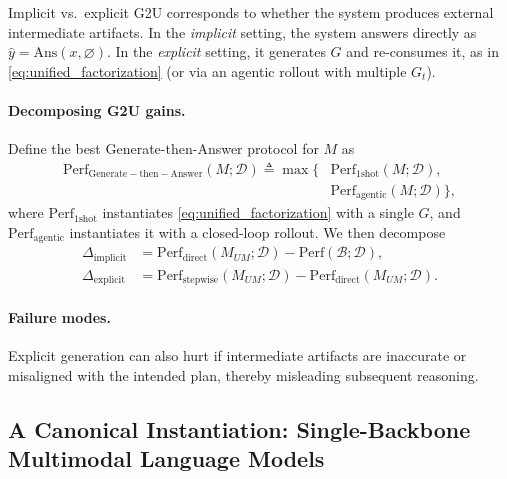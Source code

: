 \documentclass{article}
\theoremstyle{plain}
\theoremstyle{definition}
\theoremstyle{remark}
\begin{document}
Implicit vs.\ explicit G2U corresponds to whether the system produces external intermediate artifacts.
In the \emph{implicit} setting, the system answers directly as $\hat{y}=\mathrm{Ans}(x,\varnothing)$.
In the \emph{explicit} setting, it generates $G$ and re-consumes it, as in \eqref{eq:unified_factorization}
(or via an agentic rollout with multiple $G_t$).

\paragraph{Decomposing G2U gains.}
Define the best Generate-then-Answer  protocol for $M$ as
\begin{equation}
\begin{aligned}
\mathrm{Perf}_{\mathrm{Generate-then-Answer }}(M;\mathcal{D})
\triangleq
\max\Big\{
&\mathrm{Perf}_{\mathrm{1shot}}(M;\mathcal{D}), \\
&\mathrm{Perf}_{\mathrm{agentic}}(M;\mathcal{D})
\Big\},
\end{aligned}
\label{eq:perf_stepwise_def}
\end{equation}
where $\mathrm{Perf}_{\mathrm{1shot}}$ instantiates \eqref{eq:unified_factorization} with a single $G$,
and $\mathrm{Perf}_{\mathrm{agentic}}$ instantiates it with a closed-loop rollout.
We then decompose
\begin{equation}
\begin{aligned}
\Delta_{\mathrm{implicit}}
&= \mathrm{Perf}_{\mathrm{direct}}(M_{UM};\mathcal{D})-\mathrm{Perf}(\mathcal{B};\mathcal{D}), \\
\Delta_{\mathrm{explicit}}
&= \mathrm{Perf}_{\mathrm{stepwise}}(M_{UM};\mathcal{D})-\mathrm{Perf}_{\mathrm{direct}}(M_{UM};\mathcal{D}).
\end{aligned}
\label{eq:g2u_decomp}
\end{equation}

\paragraph{Failure modes.}
Explicit generation can also hurt if intermediate artifacts are inaccurate or misaligned with the intended plan, thereby misleading
subsequent reasoning.

\subsection{A Canonical Instantiation: Single-Backbone Multimodal Language Models}
\label{sec:unified_single_backbone}
\end{document}
